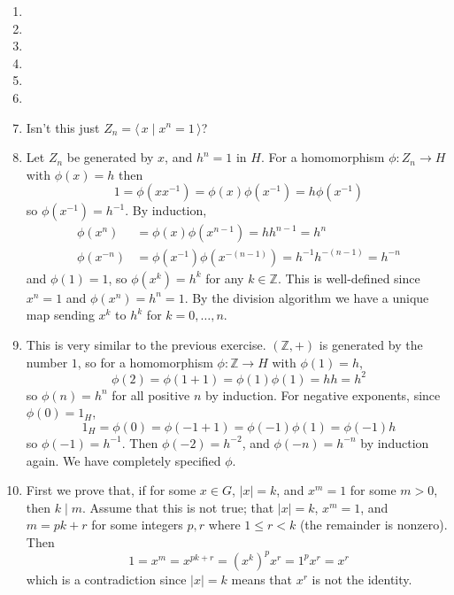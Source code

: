 \documentclass[]{article}
\newcommand{\abs}[1]{\left\vert #1 \right\vert}
\newcommand{\bbz}{\mathbb{Z}}
\begin{document}
\begin{enumerate}
\item 


\item 


\item 


\item 


\item 


\item 


\item Isn't this just $Z_n = \langle\, x\mid x^n = 1\,\rangle$?


\item Let $Z_n$ be generated by $x$, and $h^n = 1$ in $H$. For a homomorphism $\phi: Z_n \to H$ with $\phi(x) = h$ then
\begin{equation}
1 = \phi(xx^{-1}) = \phi(x)\phi(x^{-1}) = h\phi(x^{-1})
\end{equation}
so $\phi(x^{-1}) = h^{-1}$. By induction,
\begin{align}
\phi(x^n) &= \phi(x)\phi(x^{n-1}) = hh^{n-1} = h^n \\
\phi(x^{-n}) &= \phi(x^{-1})\phi(x^{-(n-1)}) = h^{-1}h^{-(n-1)} = h^{-n}
\end{align}
and $\phi(1) = 1$, so $\phi(x^k) = h^k$ for any $k\in\bbz$. This is well-defined since $x^n = 1$ and $\phi(x^n) = h^n = 1$. By the division algorithm we have a unique map sending $x^k$ to $h^k$ for $k = 0,\ldots,n$.


\item This is very similar to the previous exercise. $(\bbz, +)$ is generated by the number $1$, so for a homomorphism $\phi: \bbz \to H$ with $\phi(1) = h$, 
\begin{equation}
\phi(2) = \phi(1+1) = \phi(1)\phi(1) = hh = h^2
\end{equation}
so $\phi(n) = h^n$ for all positive $n$ by induction. For negative exponents, since $\phi(0) = 1_H$,
\begin{equation}
1_H = \phi(0) = \phi(-1 + 1) = \phi(-1)\phi(1) = \phi(-1)h
\end{equation}
so $\phi(-1) = h^{-1}$. Then $\phi(-2) = h^{-2}$, and $\phi(-n) = h^{-n}$ by induction again. We have completely specified $\phi$. 


\item First we prove that, if for some $x\in G$, $\abs{x} = k$, and $x^m = 1$ for some $m>0$, then $k\mid m$. Assume that this is not true; that $\abs{x} = k$, $x^m = 1$, and $m = pk + r$ for some integers $p,r$ where $1 \leq r < k$ (the remainder is nonzero). Then 
\begin{equation}
1 = x^m = x^{pk + r} = \left(x^k \right)^p x^r = 1^p x^r = x^r
\end{equation}
which is a contradiction since $\abs{x} = k$ means that $x^r$ is not the identity. \\


\end{enumerate}
\end{document}
